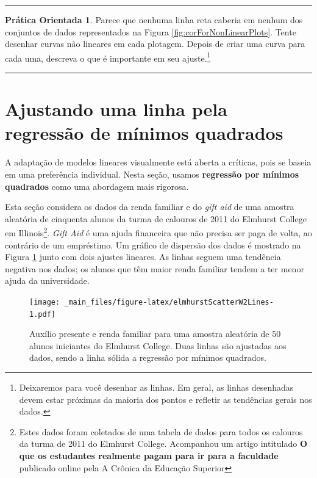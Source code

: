 \documentclass[
]{book}
\theoremstyle{definition}
\theoremstyle{definition}
\theoremstyle{definition}
\newtheorem{exercise}{Prática Orientada}[chapter]
\theoremstyle{definition}
\theoremstyle{remark}
\begin{document}
\begin{center}\rule{0.5\linewidth}{0.5pt}\end{center}

\begin{exercise}
\protect\hypertarget{exr:unnamed-chunk-271}{}{\label{exr:unnamed-chunk-271} }Parece que nenhuma linha reta caberia em nenhum dos conjuntos de dados representados na Figura \ref{fig:corForNonLinearPlots}. Tente desenhar curvas não lineares em cada plotagem. Depois de criar uma curva para cada uma, descreva o que é importante em seu ajuste.\footnote{Deixaremos para você desenhar as linhas. Em geral, as linhas desenhadas devem estar próximas da maioria dos pontos e refletir as tendências gerais nos dados.}
\end{exercise}

\begin{center}\rule{0.5\linewidth}{0.5pt}\end{center}

\hypertarget{fittingALineByLSR}{%
\section{Ajustando uma linha pela regressão de mínimos quadrados}\label{fittingALineByLSR}}

A adaptação de modelos lineares visualmente está aberta a críticas, pois se baseia em uma preferência individual. Nesta seção, usamos \textbf{regressão por mínimos quadrados} como uma abordagem mais rigorosa.

Esta seção considera os dados da renda familiar e do \emph{gift aid} de uma amostra aleatória de cinquenta alunos da turma de calouros de 2011 do Elmhurst College em Illinois\footnote{Estes dados foram coletados de uma tabela de dados para todos os calouros da turma de 2011 do Elmhurst College. Acompanhou um artigo intitulado \textbf{O que os estudantes realmente pagam para ir para a faculdade} publicado online pela A Crônica da Educação Superior}. \emph{Gift Aid} é uma ajuda financeira que não precisa ser paga de volta, ao contrário de um empréstimo. Um gráfico de dispersão dos dados é mostrado na Figura \ref{fig:elmhurstScatterW2Lines} junto com dois ajustes lineares. As linhas seguem uma tendência negativa nos dados; os alunos que têm maior renda familiar tendem a ter menor ajuda da universidade.

\begin{figure}
\centering
\texttt{[image: \_main\_files/figure-latex/elmhurstScatterW2Lines-1.pdf]}
\caption{\label{fig:elmhurstScatterW2Lines}Auxílio presente e renda familiar para uma amostra aleatória de 50 alunos iniciantes do Elmhurst College. Duas linhas são ajustadas aos dados, sendo a linha sólida a regressão por mínimos quadrados.}
\end{figure}
\end{document}
